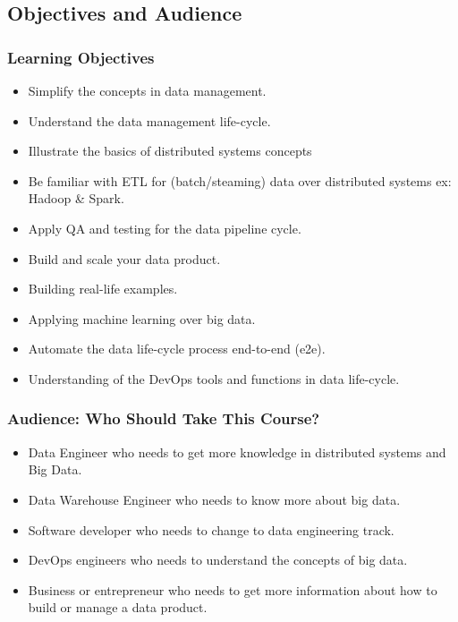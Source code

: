 \subsection{Objectives and Audience}
\begin{frame}
\frametitle{Learning Objectives}

\begin{itemize}[<+->]
	\item Simplify the concepts in data management.
	\item Understand the data management life-cycle. 
	\item Illustrate the basics of distributed systems concepts 
	\item Be familiar with ETL for (batch/steaming) data over distributed systems ex: Hadoop \& Spark.  
	\item Apply QA and testing for the data pipeline cycle.
	\item Build and scale your data product. 
	\item Building real-life examples.    
	\item Applying machine learning over big data. 
	\item Automate the data life-cycle process end-to-end (e2e). 
	\item Understanding of the DevOps tools and functions in data life-cycle. 
\end{itemize}

\end{frame}

\begin{frame}
\frametitle{Audience: Who Should Take This Course?}

\begin{itemize}[<+->]
	\item Data Engineer who needs to get more knowledge in distributed systems and Big Data.
	\item Data Warehouse Engineer who needs to know more about big data.
	\item Software developer who needs to change to data engineering track. 
	\item DevOps engineers who needs to understand the concepts of big data.  
	\item Business or entrepreneur who needs to get more information about how to build or manage a data product.
\end{itemize}

\end{frame}

